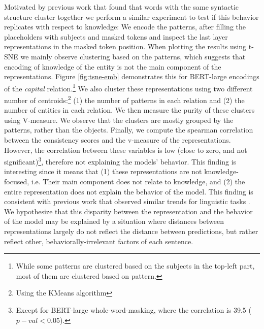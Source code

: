 Motivated by previous work that found that words with the same syntactic structure cluster together \cite{chi-etal-2020-finding,ravfogel-etal-2020-unsupervised} we perform a similar experiment to test if this behavior replicates with respect to knowledge:
We encode the patterns, after filling the placeholders with subjects and masked tokens and inspect the last layer representations in the masked token position.
When plotting the results using t-SNE \cite{tsne} we mainly
observe clustering based on the patterns, which suggests
that
encoding of knowledge of the entity is not the main component of the representations.
Figure \ref{fig:tsne-emb} demonstrates
this
for BERT-large encodings of the \textit{capital} relation.\footnote{While some patterns are clustered based on the subjects in the top-left part, most of them are clustered based on pattern.}
We also cluster these representations using two different number of centroids:\footnote {Using the KMeans algorithm} (1) the number of patterns in each relation and (2) the number of entities in each relation. We then measure the purity of these clusters using V-measure. We observe that the clusters are mostly grouped by the patterns, rather than the objects.
Finally, we compute the spearman correlation between the consistency scores and the v-measure of the representations.
However, the correlation between these variables is low (close to zero, and not significant)\footnote{Except for BERT-large whole-word-masking, where the correlation is 39.5 ($p-val<0.05$).}, therefore not explaining the models' behavior.
This finding is interesting since it means that (1) these representations are not knowledge-focused, i.e. Their main component does not relate to knowledge, and (2) the entire representation does not explain the behavior of the model. This finding is consistent with previous work that observed similar trends for linguistic tasks \cite{amnesic_probing}.
We hypothesize that this disparity between the representation and the behavior of the model may be explained by a situation where distances between representations largely do not reflect the distance between predictions, but rather reflect other, behaviorally-irrelevant factors of each sentence.


